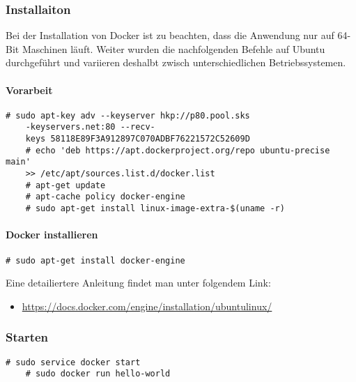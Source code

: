 \subsubsection{Installaiton}
Bei der Installation von Docker ist zu beachten, dass die Anwendung nur auf 64-Bit Maschinen läuft. Weiter wurden die nachfolgenden Befehle auf Ubuntu durchgeführt und variieren deshalbt zwisch unterschiedlichen Betriebssystemen. 

\paragraph{Vorarbeit}
\begin{lstlisting}[style=BashInputStyle]
	# sudo apt-key adv --keyserver hkp://p80.pool.sks
	-keyservers.net:80 --recv-		
	keys 58118E89F3A912897C070ADBF76221572C52609D
	# echo 'deb https://apt.dockerproject.org/repo ubuntu-precise main' 
	>> /etc/apt/sources.list.d/docker.list
	# apt-get update
	# apt-cache policy docker-engine
	# sudo apt-get install linux-image-extra-$(uname -r)
\end{lstlisting}
\paragraph{Docker installieren}
\begin{lstlisting}[style=BashInputStyle]
	# sudo apt-get install docker-engine
\end{lstlisting}

Eine detailiertere Anleitung findet man unter folgendem Link:
\begin{itemize}
	\item \url{https://docs.docker.com/engine/installation/ubuntulinux/}
\end{itemize}

\subsubsection{Starten}
\begin{lstlisting}[style=BashInputStyle]
	# sudo service docker start
	# sudo docker run hello-world
\end{lstlisting}

